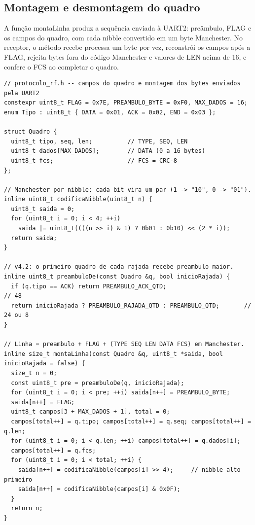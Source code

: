 \documentclass[12pt, oneside, a4paper, sumario=tradicional, chapter=TITLE, brazilian]{abntex2}
\begin{document}
\begin{apendicesenv}
\section{Montagem e desmontagem do quadro}

A função montaLinha produz a sequência enviada à UART2: preâmbulo, FLAG e os campos do quadro, com cada nibble convertido em um byte Manchester. No receptor, o método recebe processa um byte por vez, reconstrói os campos após a FLAG, rejeita bytes fora do código Manchester e valores de LEN acima de 16, e confere o FCS ao completar o quadro.

\begin{Verbatim}[fontsize=\scriptsize,frame=single,framesep=2mm,rulecolor=\color{gray!60},breaklines,breakanywhere]
// protocolo_rf.h -- campos do quadro e montagem dos bytes enviados pela UART2
constexpr uint8_t FLAG = 0x7E, PREAMBULO_BYTE = 0xF0, MAX_DADOS = 16;
enum Tipo : uint8_t { DATA = 0x01, ACK = 0x02, END = 0x03 };

struct Quadro {
  uint8_t tipo, seq, len;          // TYPE, SEQ, LEN
  uint8_t dados[MAX_DADOS];        // DATA (0 a 16 bytes)
  uint8_t fcs;                     // FCS = CRC-8
};

// Manchester por nibble: cada bit vira um par (1 -> "10", 0 -> "01").
inline uint8_t codificaNibble(uint8_t n) {
  uint8_t saida = 0;
  for (uint8_t i = 0; i < 4; ++i)
    saida |= uint8_t((((n >> i) & 1) ? 0b01 : 0b10) << (2 * i));
  return saida;
}

// v4.2: o primeiro quadro de cada rajada recebe preambulo maior.
inline uint8_t preambuloDe(const Quadro &q, bool inicioRajada) {
  if (q.tipo == ACK) return PREAMBULO_ACK_QTD;                       // 48
  return inicioRajada ? PREAMBULO_RAJADA_QTD : PREAMBULO_QTD;       // 24 ou 8
}

// Linha = preambulo + FLAG + (TYPE SEQ LEN DATA FCS) em Manchester.
inline size_t montaLinha(const Quadro &q, uint8_t *saida, bool inicioRajada = false) {
  size_t n = 0;
  const uint8_t pre = preambuloDe(q, inicioRajada);
  for (uint8_t i = 0; i < pre; ++i) saida[n++] = PREAMBULO_BYTE;
  saida[n++] = FLAG;
  uint8_t campos[3 + MAX_DADOS + 1], total = 0;
  campos[total++] = q.tipo; campos[total++] = q.seq; campos[total++] = q.len;
  for (uint8_t i = 0; i < q.len; ++i) campos[total++] = q.dados[i];
  campos[total++] = q.fcs;
  for (uint8_t i = 0; i < total; ++i) {
    saida[n++] = codificaNibble(campos[i] >> 4);     // nibble alto primeiro
    saida[n++] = codificaNibble(campos[i] & 0x0F);
  }
  return n;
}


\end{Verbatim}
\end{apendicesenv}
\end{document}
